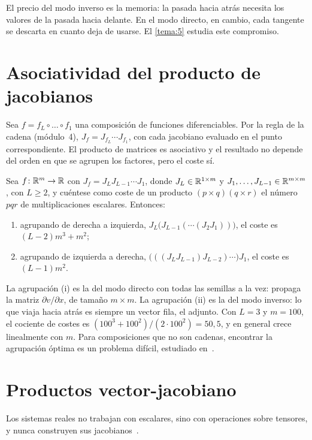 El precio del modo inverso es la memoria: la pasada hacia atrás necesita los valores de la pasada hacia delante. En el modo directo, en cambio, cada tangente se descarta en cuanto deja de usarse. El \cref{tema:5} estudia este compromiso.

\section{Asociatividad del producto de jacobianos}

Sea $f=f_L\circ\dots\circ f_1$ una composición de funciones diferenciables. Por la regla de la cadena (módulo~4), $J_f=J_{f_L}\cdots J_{f_1}$, con cada jacobiano evaluado en el punto correspondiente. El producto de matrices es asociativo y el resultado no depende del orden en que se agrupen los factores, pero el coste sí.

\begin{proposicion}\label{prop:asociatividad}
Sea $f\colon\mathbb{R}^{m}\to\mathbb{R}$ con $J_f=J_L J_{L-1}\cdots J_1$, donde $J_L\in\mathbb{R}^{1\times m}$ y $J_1,\dots,J_{L-1}\in\mathbb{R}^{m\times m}$, con $L\ge 2$, y cuéntese como coste de un producto $(p\times q)(q\times r)$ el número $pqr$ de multiplicaciones escalares. Entonces:
\begin{enumerate}
  \item agrupando de derecha a izquierda, $J_L\bigl(J_{L-1}(\cdots(J_2J_1))\bigr)$, el coste es $(L-2)m^{3}+m^{2}$;
  \item agrupando de izquierda a derecha, $\bigl(((J_LJ_{L-1})J_{L-2})\cdots\bigr)J_1$, el coste es $(L-1)m^{2}$.
\end{enumerate}
\end{proposicion}

La agrupación (i) es la del modo directo con todas las semillas a la vez: propaga la matriz $\partial v/\partial x$, de tamaño $m\times m$. La agrupación (ii) es la del modo inverso: lo que viaja hacia atrás es siempre un vector fila, el adjunto. Con $L=3$ y $m=100$, el cociente de costes es $(100^{3}+100^{2})/(2\cdot 100^{2})=50{,}5$, y en general crece linealmente con $m$. Para composiciones que no son cadenas, encontrar la agrupación óptima es un problema difícil, estudiado en~\cite[cap.~9 y~10]{gw}.

\section{Productos vector-jacobiano}

Los sistemas reales no trabajan con escalares, sino con operaciones sobre tensores, y nunca construyen sus jacobianos~\cite{grosse}.

